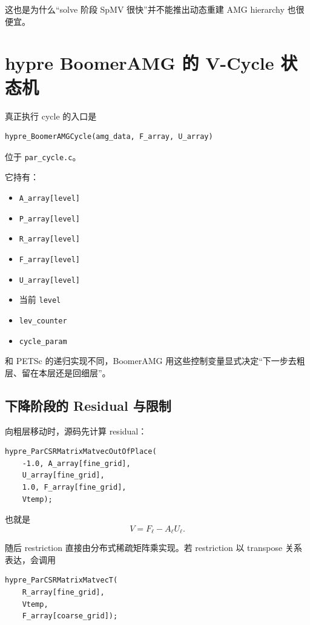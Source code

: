 这也是为什么“solve 阶段 SpMV 很快”并不能推出动态重建 AMG hierarchy 也很便宜。

\section{hypre BoomerAMG 的 V-Cycle 状态机}

真正执行 cycle 的入口是
\begin{verbatim}
hypre_BoomerAMGCycle(amg_data, F_array, U_array)
\end{verbatim}
位于 \texttt{par\_cycle.c}。

它持有：

\begin{itemize}
\item \texttt{A\_array[level]}
\item \texttt{P\_array[level]}
\item \texttt{R\_array[level]}
\item \texttt{F\_array[level]}
\item \texttt{U\_array[level]}
\item 当前 \texttt{level}
\item \texttt{lev\_counter}
\item \texttt{cycle\_param}
\end{itemize}

和 PETSc 的递归实现不同，BoomerAMG 用这些控制变量显式决定“下一步去粗层、留在本层还是回细层”。

\subsection{下降阶段的 Residual 与限制}

向粗层移动时，源码先计算 residual：

\begin{verbatim}
hypre_ParCSRMatrixMatvecOutOfPlace(
    -1.0, A_array[fine_grid],
    U_array[fine_grid],
    1.0, F_array[fine_grid],
    Vtemp);
\end{verbatim}

也就是
\begin{equation}
V
=
F_\ell-A_\ell U_\ell.
\end{equation}

随后 restriction 直接由分布式稀疏矩阵乘实现。若 restriction 以 transpose 关系表达，会调用

\begin{verbatim}
hypre_ParCSRMatrixMatvecT(
    R_array[fine_grid],
    Vtemp,
    F_array[coarse_grid]);
\end{verbatim}

